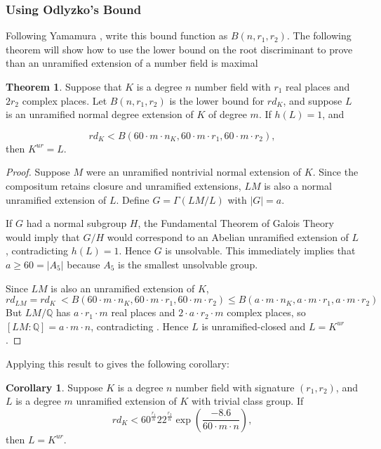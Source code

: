 \documentclass[12pt]{extarticle}
\newcommand{\Q}{\mathbb{Q}}
\newcommand{\<}{\langle}
\renewcommand{\>}{\rangle}
\theoremstyle{definition}
\newtheorem{theorem}{Theorem}
\newtheorem{corollary}{Corollary}
\begin{document}
\subsubsection*{Using Odlyzko's Bound}
Following Yamamura \cite{YAMA1986}, write this bound function as $B(n,r_1,r_2)$. The following theorem will show how to use the lower bound on the root discriminant to prove than an unramified extension of a number field is maximal
\begin{theorem}
Suppose that $K$ is a degree $n$ number field with $r_1$ real places and $2r_2$ complex places. Let $B(n,r_1,r_2)$ is the lower bound for $rd_K$, and suppose $L$ is an unramified normal degree extension of $K$ of degree $m$. If $h(L)=1$, and

\begin{equation}
        rd_K<B(60 \cdot m \cdot n_K,60 \cdot m \cdot r_1,60 \cdot m \cdot r_2),
    \end{equation}
    then $K^{ur}=L$.
\end{theorem}
\begin{proof}
Suppose $M$ were an unramified nontrivial normal extension of $K$. Since the compositum retains closure and unramified extensions, $LM$ is also a normal unramified extension of $L$. Define $G=\Gamma(LM/L)$ with $|G|=a$. \par 
If $G$ had a normal subgroup $H$, the Fundamental Theorem of Galois Theory would imply that $G/H$ would correspond to an Abelian unramified extension of $L$, contradicting $h(L)=1$. Hence $G$ is unsolvable. This immediately implies that $a\geqslant 60 = |A_5|$ because $A_5$ is the smallest unsolvable group.\par
Since $LM$ is also an unramified extension of $K$, 
\begin{equation} 
    rd_{LM}=rd_{K}\ < B(60 \cdot m \cdot n_K,60 \cdot m \cdot r_1,60 \cdot m \cdot r_2)\leq B(a \cdot m \cdot n_K,a \cdot m \cdot r_1,a \cdot m \cdot r_2) \label{odlyzko} \tag{*} 
\end{equation} 
But $LM/\Q$ has $a \cdot r_1 \cdot m$ real places and $2 \cdot a \cdot r_2 \cdot m$ complex places, so $[LM:\Q] = a \cdot m \cdot n$, contradicting . Hence $L$ is unramified-closed and $L=K^{ur}$. 
\end{proof}
Applying this result to  gives the following corollary:
\begin{corollary}
Suppose $K$ is a degree $n$ number field with signature $(r_1,r_2)$, and $L$ is a degree $m$ unramified extension of $K$ with trivial class group. If 
\begin{equation}
rd_K< 60 ^{\frac{r_1}{n}} 22 ^{\frac{r_2}{n}} \exp\left(\frac{-8.6}{60\cdot m \cdot n}\right),
\end{equation}
then $L=K^{ur}$. 
\end{corollary}
\end{document}
